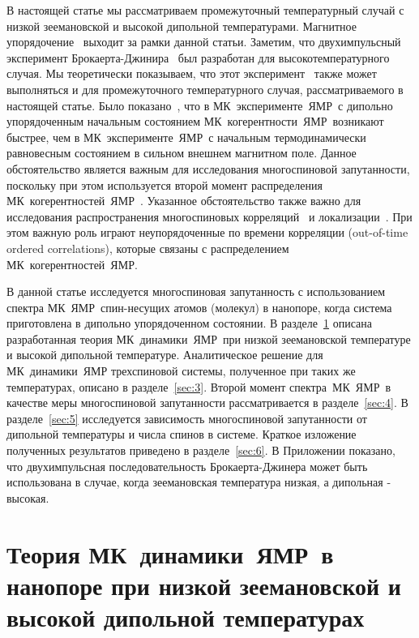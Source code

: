 \documentclass[utf8]{jetp}
\begin{document}
В настоящей статье мы рассматриваем промежуточный температурный случай с низкой зеемановской и высокой дипольной температурами.
Магнитное упорядочение~\cite{Abragam_1982} выходит за рамки данной статьи.
Заметим, что двухимпульсный эксперимент Брокаерта-Джинира~\cite{Jeener_1967} был разработан для высокотемпературного случая.
Мы теоретически  показываем, что этот эксперимент~\cite{Jeener_1967} также может выполняться и для промежуточного температурного случая, рассматриваемого в настоящей статье.
Было показано~\cite{Doronin_2011}, что в МК~эксперименте~ЯМР~с дипольно упорядоченным начальным состоянием МК~когерентности~ЯМР~возникают быстрее,
чем в МК~эксперименте~ЯМР~с начальным термодинамически равновесным состоянием в сильном внешнем магнитном поле.
Данное обстоятельство является важным для исследования многоспиновой запутанности, поскольку при этом используется  второй момент распределения МК~когерентностей~ЯМР~.
Указанное обстоятельство также важно для исследования распространения многоспиновых корреляций~\cite{Baugh_2001,Baum_1986,S_nchez_2014,Munowitz_1987} и локализации~\cite{Alvarez_2015,Wei_2018}.
При этом важную роль играют неупорядоченные по времени корреляции (out-of-time ordered correlations), которые связаны с распределением МК~когерентностей~ЯМР.

В данной статье исследуется многоспиновая запутанность с использованием спектра МК~ЯМР~спин-несущих атомов (молекул) в нанопоре, когда система приготовлена в дипольно упорядоченном состоянии.
В разделе~\ref{sec:2} описана разработанная теория МК~динамики~ЯМР~при низкой зеемановской температуре и высокой дипольной температуре.
Аналитическое решение для МК~динамики~ЯМР трехспиновой системы, полученное при таких же температурах,  описано в разделе~\ref{sec:3}.
Второй момент спектра~МК~ЯМР~в качестве меры многоспиновой запутанности рассматривается в разделе~\ref{sec:4}.
В разделе~\ref{sec:5} исследуется зависимость многоспиновой запутанности от дипольной температуры и числа спинов в системе.
Краткое изложение полученных результатов приведено в разделе~\ref{sec:6}.
В Приложении показано, что двухимпульсная последовательность Брокаерта-Джинера может быть использована в случае, когда зеемановская температура низкая, а дипольная - высокая.



\section{Теория МК~динамики~ЯМР~в нанопоре при низкой зеемановской  и высокой дипольной температурах}
\label{sec:2}
\end{document}
